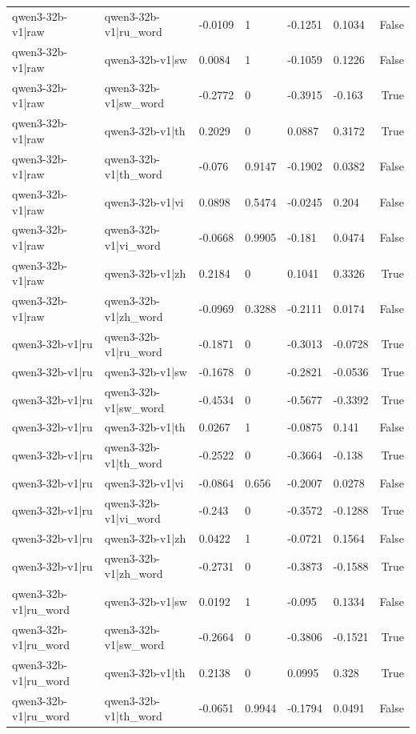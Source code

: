 \begin{table}
\begin{tabular}{llllllr}
qwen3-32b-v1|raw & qwen3-32b-v1|ru_word & -0.0109 & 1 & -0.1251 & 0.1034 & False \\
qwen3-32b-v1|raw & qwen3-32b-v1|sw & 0.0084 & 1 & -0.1059 & 0.1226 & False \\
qwen3-32b-v1|raw & qwen3-32b-v1|sw_word & -0.2772 & 0 & -0.3915 & -0.163 & True \\
qwen3-32b-v1|raw & qwen3-32b-v1|th & 0.2029 & 0 & 0.0887 & 0.3172 & True \\
qwen3-32b-v1|raw & qwen3-32b-v1|th_word & -0.076 & 0.9147 & -0.1902 & 0.0382 & False \\
qwen3-32b-v1|raw & qwen3-32b-v1|vi & 0.0898 & 0.5474 & -0.0245 & 0.204 & False \\
qwen3-32b-v1|raw & qwen3-32b-v1|vi_word & -0.0668 & 0.9905 & -0.181 & 0.0474 & False \\
qwen3-32b-v1|raw & qwen3-32b-v1|zh & 0.2184 & 0 & 0.1041 & 0.3326 & True \\
qwen3-32b-v1|raw & qwen3-32b-v1|zh_word & -0.0969 & 0.3288 & -0.2111 & 0.0174 & False \\
qwen3-32b-v1|ru & qwen3-32b-v1|ru_word & -0.1871 & 0 & -0.3013 & -0.0728 & True \\
qwen3-32b-v1|ru & qwen3-32b-v1|sw & -0.1678 & 0 & -0.2821 & -0.0536 & True \\
qwen3-32b-v1|ru & qwen3-32b-v1|sw_word & -0.4534 & 0 & -0.5677 & -0.3392 & True \\
qwen3-32b-v1|ru & qwen3-32b-v1|th & 0.0267 & 1 & -0.0875 & 0.141 & False \\
qwen3-32b-v1|ru & qwen3-32b-v1|th_word & -0.2522 & 0 & -0.3664 & -0.138 & True \\
qwen3-32b-v1|ru & qwen3-32b-v1|vi & -0.0864 & 0.656 & -0.2007 & 0.0278 & False \\
qwen3-32b-v1|ru & qwen3-32b-v1|vi_word & -0.243 & 0 & -0.3572 & -0.1288 & True \\
qwen3-32b-v1|ru & qwen3-32b-v1|zh & 0.0422 & 1 & -0.0721 & 0.1564 & False \\
qwen3-32b-v1|ru & qwen3-32b-v1|zh_word & -0.2731 & 0 & -0.3873 & -0.1588 & True \\
qwen3-32b-v1|ru_word & qwen3-32b-v1|sw & 0.0192 & 1 & -0.095 & 0.1334 & False \\
qwen3-32b-v1|ru_word & qwen3-32b-v1|sw_word & -0.2664 & 0 & -0.3806 & -0.1521 & True \\
qwen3-32b-v1|ru_word & qwen3-32b-v1|th & 0.2138 & 0 & 0.0995 & 0.328 & True \\
qwen3-32b-v1|ru_word & qwen3-32b-v1|th_word & -0.0651 & 0.9944 & -0.1794 & 0.0491 & False \\

\end{tabular}
\end{table}
